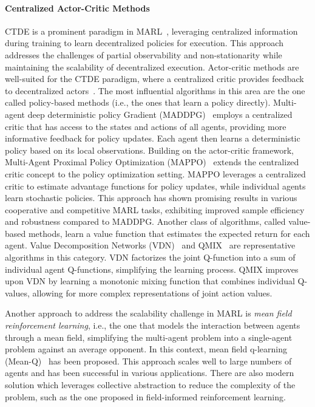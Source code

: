 \documentclass[sigconf]{acmart}
\begin{document}
\paragraph{Centralized Actor-Critic Methods} CTDE is a prominent paradigm in MARL~\cite{ning2024survey}, 
leveraging centralized information during training to learn decentralized policies for execution. 
This approach addresses the challenges of partial observability and non-stationarity while maintaining the scalability of decentralized execution. %
Actor-critic methods are well-suited for the CTDE paradigm, 
where a centralized critic provides feedback to decentralized actors~\cite{DBLP:conf/icml/RashidSWFFW18,DBLP:journals/corr/SunehagLGCZJLSL17,yu2022surprising,DBLP:conf/nips/LoweWTHAM17}. 
% 
The most influential algorithms in this area are the one called policy-based methods (i.e., the ones that learn a policy directly).
%
Multi-agent deep deterministic policy Gradient (MADDPG)~\cite{DBLP:conf/nips/LoweWTHAM17} employs a centralized critic that has access to the states and actions of all agents, providing more informative feedback for policy updates. 
Each agent then learns a deterministic policy based on its local observations. %
Building on the actor-critic framework, Multi-Agent Proximal Policy Optimization (MAPPO)~\cite{yu2022surprising} extends the centralized critic concept to the policy optimization setting. 
MAPPO leverages a centralized critic to estimate advantage functions for policy updates, while individual agents learn stochastic policies. 
This approach has shown promising results in various cooperative and competitive MARL tasks, exhibiting improved sample efficiency and robustness compared to MADDPG. %
Another class of algorithms, called value-based methods, learn a value function that estimates the expected return for each agent.
%
Value Decomposition Networks (VDN)~\cite{DBLP:journals/corr/SunehagLGCZJLSL17} and QMIX~\cite{DBLP:conf/icml/RashidSWFFW18} are representative algorithms in this category. 
VDN factorizes the joint Q-function into a sum of individual agent Q-functions, simplifying the learning process. 
QMIX improves upon VDN by learning a monotonic mixing function that combines individual Q-values, 
allowing for more complex representations of joint action values. %

Another approach to address the scalability challenge in MARL is \emph{mean field reinforcement learning}, i.e., the one that models the interaction between agents through a mean field, simplifying the multi-agent problem into a single-agent problem against an average opponent.
%
In this context, mean field q-learning (Mean-Q)~\cite{DBLP:conf/icml/YangLLZZW18} has been proposed.
This approach scales well to large numbers of agents and has been successful in various applications. 
% 
There are also modern solution which leverages collective abstraction to reduce the complexity of the problem, such as the one proposed in field-informed reinforcement learning.
\end{document}

